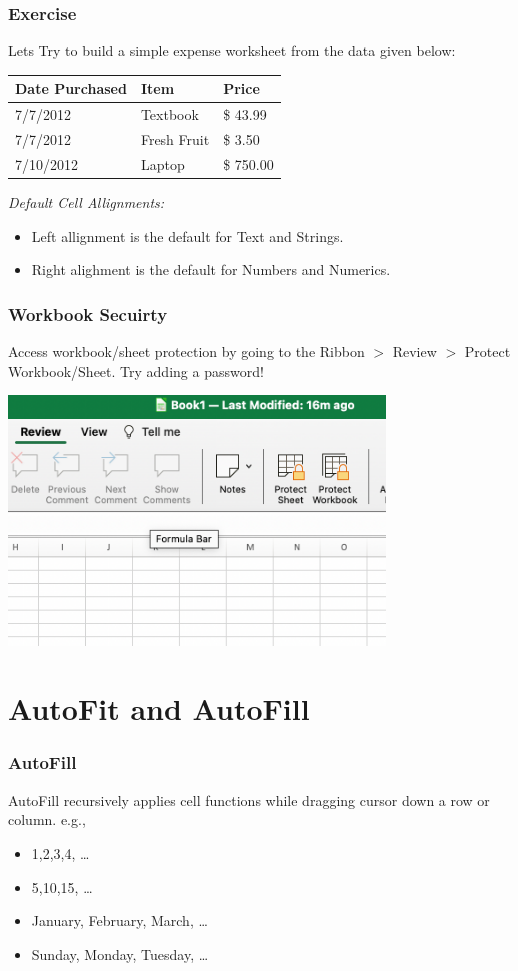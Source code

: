\documentclass[12pt]{beamer}
\begin{document}
	\begin{frame}
		\frametitle{Exercise}
		Lets Try to build a simple expense worksheet from the data given below:\\
		\begin{center}
			\begin{tabular}{ |l|l|l|}
				\hline
				Date Purchased & Item & Price\\
				\hline
				7/7/2012 & Textbook  & \$ 43.99\\
				7/7/2012 & Fresh Fruit& \$ 3.50 \\
				7/10/2012 & Laptop & \$ 750.00\\
				\hline
			\end{tabular}
		\end{center}
	\bigskip
	\textit{Default Cell Allignments:}
	\begin{itemize}
		\item Left allignment is the default for Text and Strings.
		\item Right alighment is the default for Numbers and Numerics.
	\end{itemize}
	\end{frame}
	\begin{frame}
		\frametitle{Workbook Secuirty}
			Access workbook/sheet protection by going to the Ribbon $>$ Review $>$ Protect Workbook/Sheet. 
			Try adding a password!
			\begin{center}
				\includegraphics[width=10cm]{protectWorkbook.png}
			\end{center}
	\end{frame}
	\section{AutoFit and AutoFill}
	\begin{frame}
		\frametitle{AutoFill}
		AutoFill recursively applies cell functions while dragging cursor down a row or column. e.g., 
		\begin{itemize}
			\item 1,2,3,4, \ldots
			\item 5,10,15, \ldots
			\item January, February, March, \ldots
			\item Sunday, Monday, Tuesday, \ldots
		\end{itemize}
	\end{frame}
\end{document}
